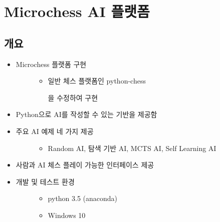 \documentclass[letterpaper,10pt,english]{sphinxmanual}
\begin{document}
\newpage


\section{Microchess AI 플랫폼}
\label{\detokenize{02-microchess_ai_platform::doc}}\label{\detokenize{02-microchess_ai_platform:microchess-ai}}

\subsection{개요}
\label{\detokenize{02-microchess_ai_platform:id1}}\begin{itemize}
\item {} \begin{description}
\item[{Microchess 플랫폼 구현}] \leavevmode\begin{itemize}
\item {} 
일반 체스 플랫폼인 python-chess %
\begin{footnote}[1]\sphinxAtStartFootnote
{}
%
\end{footnote} 을 수정하여 구현

\end{itemize}

\end{description}

\item {} 
Python으로 AI를 작성할 수 있는 기반을 제공함

\item {} \begin{description}
\item[{주요 AI 예제 네 가지 제공}] \leavevmode\begin{itemize}
\item {} 
Random AI, 탐색 기반 AI, MCTS AI, Self Learning AI

\end{itemize}

\end{description}

\item {} 
사람과 AI 체스 플레이 가능한 인터페이스 제공

\item {} \begin{description}
\item[{개발 및 테스트 환경}] \leavevmode\begin{itemize}
\item {} 
python 3.5 (anaconda)

\item {} 
Windows 10

\end{itemize}

\end{description}

\end{itemize}
\end{document}
